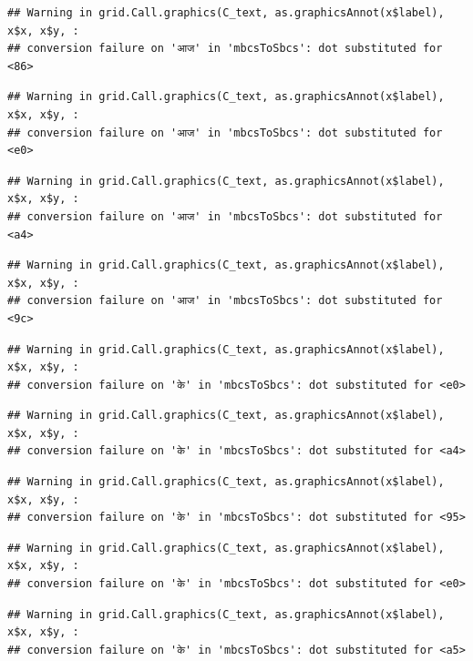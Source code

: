 \documentclass[
]{article}
\begin{document}
\begin{verbatim}
## Warning in grid.Call.graphics(C_text, as.graphicsAnnot(x$label), x$x, x$y, :
## conversion failure on 'आज' in 'mbcsToSbcs': dot substituted for <86>
\end{verbatim}

\begin{verbatim}
## Warning in grid.Call.graphics(C_text, as.graphicsAnnot(x$label), x$x, x$y, :
## conversion failure on 'आज' in 'mbcsToSbcs': dot substituted for <e0>
\end{verbatim}

\begin{verbatim}
## Warning in grid.Call.graphics(C_text, as.graphicsAnnot(x$label), x$x, x$y, :
## conversion failure on 'आज' in 'mbcsToSbcs': dot substituted for <a4>
\end{verbatim}

\begin{verbatim}
## Warning in grid.Call.graphics(C_text, as.graphicsAnnot(x$label), x$x, x$y, :
## conversion failure on 'आज' in 'mbcsToSbcs': dot substituted for <9c>
\end{verbatim}

\begin{verbatim}
## Warning in grid.Call.graphics(C_text, as.graphicsAnnot(x$label), x$x, x$y, :
## conversion failure on 'के' in 'mbcsToSbcs': dot substituted for <e0>
\end{verbatim}

\begin{verbatim}
## Warning in grid.Call.graphics(C_text, as.graphicsAnnot(x$label), x$x, x$y, :
## conversion failure on 'के' in 'mbcsToSbcs': dot substituted for <a4>
\end{verbatim}

\begin{verbatim}
## Warning in grid.Call.graphics(C_text, as.graphicsAnnot(x$label), x$x, x$y, :
## conversion failure on 'के' in 'mbcsToSbcs': dot substituted for <95>
\end{verbatim}

\begin{verbatim}
## Warning in grid.Call.graphics(C_text, as.graphicsAnnot(x$label), x$x, x$y, :
## conversion failure on 'के' in 'mbcsToSbcs': dot substituted for <e0>
\end{verbatim}

\begin{verbatim}
## Warning in grid.Call.graphics(C_text, as.graphicsAnnot(x$label), x$x, x$y, :
## conversion failure on 'के' in 'mbcsToSbcs': dot substituted for <a5>
\end{verbatim}
\end{document}
